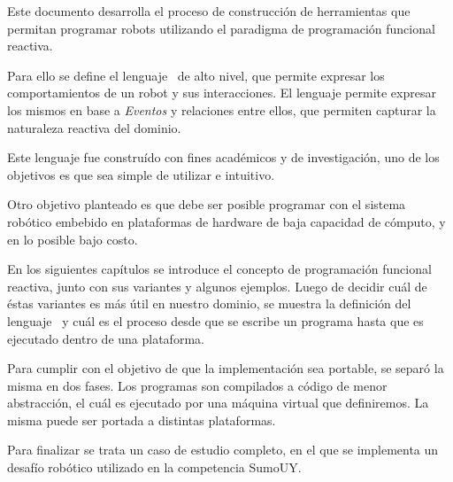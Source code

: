 
  Este documento desarrolla el proceso de construcción de
herramientas
que permitan programar robots utilizando el paradigma de
programación funcional reactiva.

  Para ello se define el lenguaje \frob\ de alto nivel,
que permite expresar los comportamientos de un robot y sus
interacciones.
  El lenguaje permite expresar los mismos en base a
\emph{Eventos} y relaciones entre ellos, que permiten
capturar la naturaleza reactiva del dominio.

  Este lenguaje fue construído con fines académicos y de
investigación, uno de los objetivos es que sea simple de
utilizar e intuitivo.

  Otro objetivo planteado es que debe ser posible programar
con el sistema robótico embebido en plataformas de
hardware de baja capacidad de cómputo, y en lo posible
bajo costo.

  En los siguientes capítulos se introduce el concepto de
programación funcional reactiva, junto con sus variantes y
algunos ejemplos.
  Luego de decidir cuál de éstas variantes es más útil
en nuestro dominio, se muestra la definición del lenguaje
\frob\ y cuál es el proceso desde que se escribe un programa
hasta que es ejecutado dentro de una plataforma.

  Para cumplir con el objetivo de que la implementación sea
portable, se separó la misma en dos fases. Los programas son
compilados a código de menor abstracción, el cuál es
ejecutado por una máquina virtual que definiremos.
  La misma puede ser portada a distintas plataformas.

  Para finalizar se trata un caso de estudio completo, en el
que se implementa un desafío robótico utilizado en la competencia
SumoUY.
